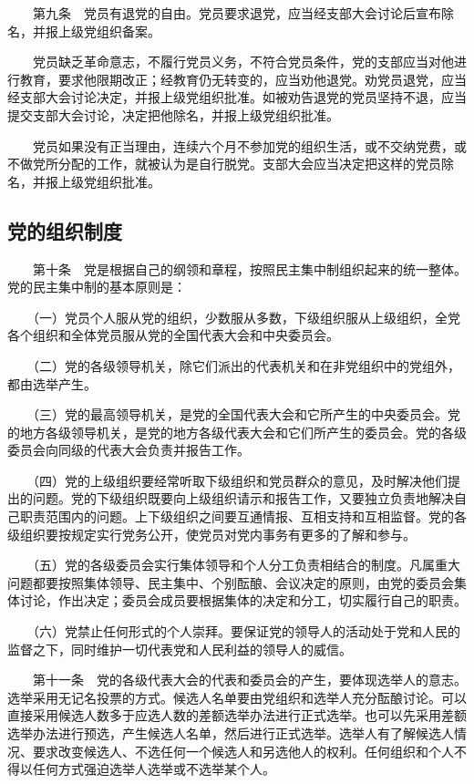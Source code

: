 　　第九条　党员有退党的自由。党员要求退党，应当经支部大会讨论后宣布除名，并报上级党组织备案。

　　党员缺乏革命意志，不履行党员义务，不符合党员条件，党的支部应当对他进行教育，要求他限期改正；经教育仍无转变的，应当劝他退党。劝党员退党，应当经支部大会讨论决定，并报上级党组织批准。如被劝告退党的党员坚持不退，应当提交支部大会讨论，决定把他除名，并报上级党组织批准。

　　党员如果没有正当理由，连续六个月不参加党的组织生活，或不交纳党费，或不做党所分配的工作，就被认为是自行脱党。支部大会应当决定把这样的党员除名，并报上级党组织批准。

    \subsection{党的组织制度}
　　第十条　党是根据自己的纲领和章程，按照民主集中制组织起来的统一整体。党的民主集中制的基本原则是：

　　（一）党员个人服从党的组织，少数服从多数，下级组织服从上级组织，全党各个组织和全体党员服从党的全国代表大会和中央委员会。

　　（二）党的各级领导机关，除它们派出的代表机关和在非党组织中的党组外，都由选举产生。

　　（三）党的最高领导机关，是党的全国代表大会和它所产生的中央委员会。党的地方各级领导机关，是党的地方各级代表大会和它们所产生的委员会。党的各级委员会向同级的代表大会负责并报告工作。

　　（四）党的上级组织要经常听取下级组织和党员群众的意见，及时解决他们提出的问题。党的下级组织既要向上级组织请示和报告工作，又要独立负责地解决自己职责范围内的问题。上下级组织之间要互通情报、互相支持和互相监督。党的各级组织要按规定实行党务公开，使党员对党内事务有更多的了解和参与。

　　（五）党的各级委员会实行集体领导和个人分工负责相结合的制度。凡属重大问题都要按照集体领导、民主集中、个别酝酿、会议决定的原则，由党的委员会集体讨论，作出决定；委员会成员要根据集体的决定和分工，切实履行自己的职责。

　　（六）党禁止任何形式的个人崇拜。要保证党的领导人的活动处于党和人民的监督之下，同时维护一切代表党和人民利益的领导人的威信。

　　第十一条　党的各级代表大会的代表和委员会的产生，要体现选举人的意志。选举采用无记名投票的方式。候选人名单要由党组织和选举人充分酝酿讨论。可以直接采用候选人数多于应选人数的差额选举办法进行正式选举。也可以先采用差额选举办法进行预选，产生候选人名单，然后进行正式选举。选举人有了解候选人情况、要求改变候选人、不选任何一个候选人和另选他人的权利。任何组织和个人不得以任何方式强迫选举人选举或不选举某个人。

